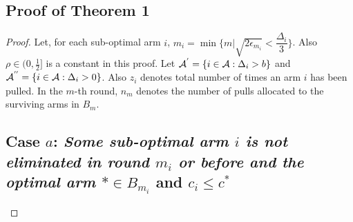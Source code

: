 \subsection{Proof of Theorem 1}
\label{sec:proofTheorem:Theorem1}
\begin{proof}
Let, for each sub-optimal arm ${i}$, $m_{i}=\min{\lbrace m|\sqrt{2\epsilon_{m_i}} < \dfrac{\Delta_{i}}{3} \rbrace}$. Also $\rho\in (0,\frac{1}{2}]$ is a constant in this proof. Let $\mathcal{A}^{'}=\lbrace i\in \mathcal{A}: \Delta_{i} > b \rbrace$ and $\mathcal{A}^{''}=\lbrace i\in \mathcal{A}: \Delta_{i} > 0 \rbrace$. Also $z_{i}$ denotes total number of times an arm $i$ has been pulled. In the $m$-th round, $n_{m}$ denotes the number of pulls allocated to the surviving arms in $B_{m}$. \\
\subsection*{Case $a$: \textit{Some sub-optimal arm ${i}$ is not eliminated in round $m_{i}$ or before and the optimal arm ${*}\in B_{m_{i}}$} and $c_i \leq c^*$}


\end{proof}
